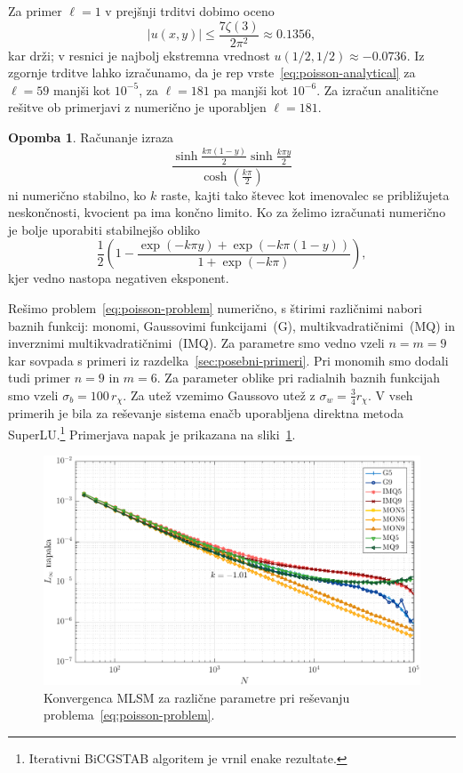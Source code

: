 \documentclass[12pt,a4paper,twoside]{article}
\theoremstyle{definition} %
\newtheorem{opomba}[definicija]{Opomba}
\theoremstyle{plain} %
\numberwithin{equation}{section}
\newlength{\iw}
\begin{document}
Za primer $\ell = 1$  v prejšnji trditvi dobimo oceno
\[
  |u(x, y)| \leq \frac{7 \zeta(3)}{2 \pi^2} \approx 0.1356,
\]
kar drži; v resnici je najbolj ekstremna vrednost $u(1/2, 1/2) \approx -0.0736$.
Iz zgornje trditve lahko izračunamo, da je rep
vrste~\eqref{eq:poisson-analytical} za $\ell = 59$ manjši kot $10^{-5}$, za
$\ell = 181$ pa manjši kot $10^{-6}$.  Za izračun analitične rešitve ob
primerjavi z numerično je uporabljen $\ell = 181$.
\begin{opomba}
  Računanje izraza \[
    \frac{\sinh \frac{k \pi  (1-y)}{2} \sinh \frac{k \pi
    y}{2}}{\cosh(\frac{k\pi}{2})}
  \] ni numerično stabilno, ko $k$ raste, kajti tako števec kot imenovalec se
  približujeta neskončnosti, kvocient pa ima končno limito. Ko za želimo izračunati
  numerično je bolje uporabiti stabilnejšo obliko
  \[
    \frac12\left( 1 - \frac{\exp(-k\pi y) + \exp(-k\pi(1-y)) }{1 +
    \exp(-k\pi)}\right),
  \]
  kjer vedno nastopa negativen eksponent.
\end{opomba}

Rešimo problem~\eqref{eq:poisson-problem} numerično, s štirimi različnimi nabori baznih funkcij:
monomi, Gaussovimi funkcijami~(G), multikvadratičnimi~(MQ) in inverznimi multikvadratičnimi~(IMQ).
Za parametre smo vedno vzeli $n = m = 9$ kar sovpada s primeri iz
razdelka~\ref{sec:posebni-primeri}. Pri monomih smo dodali tudi primer $n = 9$ in $m = 6$. Za
parameter oblike pri radialnih baznih funkcijah smo vzeli $\sigma_b = 100\, r_\chi$.  Za utež
vzemimo Gaussovo utež z $\sigma_w = \frac34 r_\chi$.  V vseh primerih je bila za reševanje sistema
enačb uporabljena direktna metoda SuperLU.\footnote{Iterativni BiCGSTAB algoritem je vrnil enake
rezultate.} Primerjava napak je prikazana na sliki~\ref{fig:poisson-square-convergence}.

\begin{figure}[h]
  \centering
  \includegraphics[width=\iw]{images/poisson_square_convergence.pdf}
  \caption[Konvergenca MLSM pri reševanju Poissonove enačbe]{Konvergenca MLSM
  za različne parametre pri reševanju problema~\eqref{eq:poisson-problem}.}
  \label{fig:poisson-square-convergence}
\end{figure}
\end{document}
